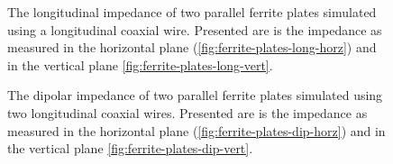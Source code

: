 \documentclass[12pt,a4paper,twopage,openright]{article}
\begin{document}
\begin{figure}
\caption{The longitudinal impedance of two parallel ferrite plates simulated using a longitudinal coaxial wire. Presented are is the impedance as measured in the horizontal plane (\ref{fig:ferrite-plates-long-horz}) and in the vertical plane \ref{fig:ferrite-plates-long-vert}.}
\label{fig:ferrite-plates-long}
\end{figure}

\begin{figure}
\caption{The dipolar impedance of two parallel ferrite plates simulated using two longitudinal coaxial wires. Presented are is the impedance as measured in the horizontal plane (\ref{fig:ferrite-plates-dip-horz}) and in the vertical plane \ref{fig:ferrite-plates-dip-vert}.}
\label{fig:ferrite-plates-dipolar}
\end{figure}
\end{document}
